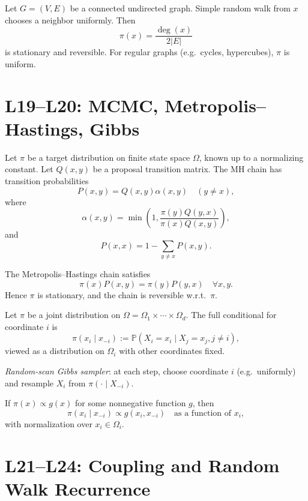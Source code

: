 \documentclass[answers,12pt,addpoints]{exam}
\begin{document}
\begin{example}
Let $G=(V,E)$ be a connected undirected graph. Simple random walk from $x$ chooses a neighbor uniformly. Then
\[
\pi(x) = \frac{\deg(x)}{2|E|}
\]
is stationary and reversible. For regular graphs (e.g.\ cycles, hypercubes), $\pi$ is uniform.
\end{example}

\section{L19–L20: MCMC, Metropolis–Hastings, Gibbs}

\begin{definition}
Let $\pi$ be a target distribution on finite state space $\Omega$, known up to a normalizing constant. Let $Q(x,y)$ be a proposal transition matrix. The MH chain has transition probabilities
\[
P(x,y) = Q(x,y)\alpha(x,y)\quad (y\neq x),
\]
where
\[
\alpha(x,y) = \min\left(1,\frac{\pi(y)Q(y,x)}{\pi(x)Q(x,y)}\right),
\]
and
\[
P(x,x) = 1 - \sum_{y\neq x} P(x,y).
\]
\end{definition}

\begin{theorem}
The Metropolis–Hastings chain satisfies
\[
\pi(x)P(x,y) = \pi(y)P(y,x)\quad \forall x,y.
\]
Hence $\pi$ is stationary, and the chain is reversible w.r.t.\ $\pi$.
\end{theorem}

\begin{definition}
Let $\pi$ be a joint distribution on $\Omega = \Omega_1\times\cdots\times\Omega_d$. The full conditional for coordinate $i$ is
\[
\pi(x_i \mid x_{-i}) := \mathbb{P}(X_i=x_i \mid X_j = x_j, j\neq i),
\]
viewed as a distribution on $\Omega_i$ with other coordinates fixed.

\emph{Random-scan Gibbs sampler}: at each step, choose coordinate $i$ (e.g.\ uniformly) and resample $X_i$ from $\pi(\cdot\mid X_{-i})$.
\end{definition}

\begin{lemma}
If $\pi(x)\propto g(x)$ for some nonnegative function $g$, then
\[
\pi(x_i \mid x_{-i}) \propto g(x_i,x_{-i}) \quad \text{as a function of }x_i,
\]
with normalization over $x_i\in\Omega_i$.
\end{lemma}

\section{L21–L24: Coupling and Random Walk Recurrence}
\end{document}
